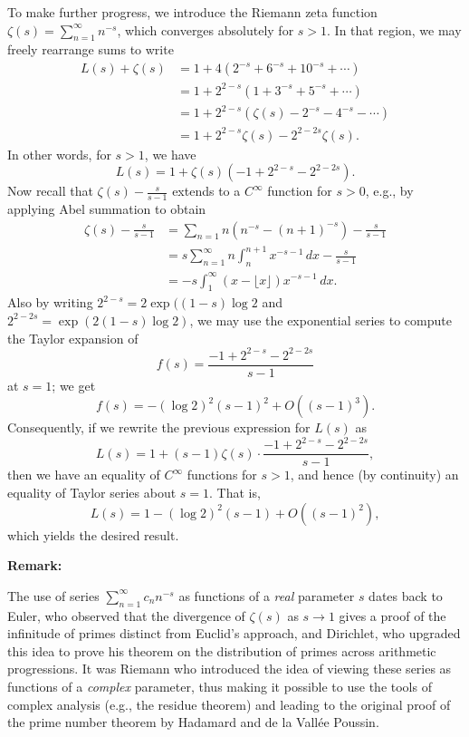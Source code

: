 \documentclass[amssymb,twocolumn,pra,10pt,aps]{revtex4-1}
\begin{document}
\begin{itemize}
To make further progress, we introduce the Riemann zeta function
$\zeta(s) = \sum_{n=1}^\infty n^{-s}$, which converges absolutely for $s>1$.
In that region, we may freely rearrange sums to write
\begin{align*}
L(s) + \zeta(s) &= 1 + 4 (2^{-s} + 6^{-s} + 10^{-s} + \cdots) \\
&= 1 + 2^{2-s} (1 + 3^{-s} + 5^{-s} + \cdots) \\
&= 1 + 2^{2-s} (\zeta(s) - 2^{-s} - 4^{-s} - \cdots) \\
&= 1 + 2^{2-s} \zeta(s) - 2^{2-2s} \zeta(s).
\end{align*}
In other words, for $s > 1$, we have
\[
L(s) = 1 + \zeta(s) (-1 + 2^{2-s} - 2^{2-2s}).
\]
Now recall that $\zeta(s) - \frac{s}{s-1}$ extends to a $C^\infty$ function
for $s>0$, e.g., by applying Abel summation to obtain
\begin{align*}
\zeta(s) - \frac{s}{s-1} &= \sum_{n=1} n (n^{-s} - (n+1)^{-s}) - \frac{s}{s-1}\\
&= s \sum_{n=1}^\infty n \int_n^{n+1} x^{-s-1}\,dx  - \frac{s}{s-1} \\
&= -s \int_1^\infty (x - \lfloor x \rfloor) x^{-s-1}\,dx.
\end{align*}
Also by writing $2^{2-s} = 2 \exp((1-s) \log 2$
and $2^{2-2s} = \exp(2(1-s)\log 2)$, we may use the exponential series
to compute the Taylor expansion of 
\[
f(s) = \frac{-1 + 2^{2-s} - 2^{2-2s}}{s-1}
\]
at $s=1$; we get
\[
f(s) = -(\log 2)^2 (s-1)^2 + O((s-1)^3).
\]
Consequently, if we rewrite the previous expression for $L(s)$ as
\[
L(s) =  1 + (s-1)\zeta(s) \cdot \frac{-1 + 2^{2-s} - 2^{2-2s}}{s-1},
\]
then we have an equality of $C^\infty$ functions for $s>1$, and
hence (by continuity) an equality of Taylor series about $s=1$. 
That is,
\[
L(s) = 1 - (\log 2)^2 (s-1) + O((s-1)^2),
\]
which yields the desired result.

\noindent
\textbf{Remark:}

The use of series $\sum_{n=1}^\infty c_n n^{-s}$ as functions of a \emph{real} parameter $s$
dates back to Euler, who observed that the divergence of $\zeta(s)$ as $s \to 1$ gives a proof of the infinitude of primes distinct from Euclid's approach, and Dirichlet, who upgraded this idea to prove his theorem on the distribution of primes across arithmetic progressions. It was Riemann who introduced the idea of viewing these series as functions of a \emph{complex} parameter, thus making it possible to use the tools of complex analysis (e.g., the residue theorem) and leading to the original proof of the prime number theorem by Hadamard and de la Vall\'ee Poussin.


\end{itemize}
\end{document}
